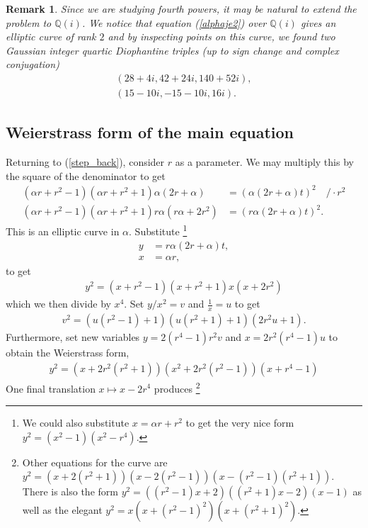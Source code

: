 \documentclass{amsart}
\newtheorem{remark}{Remark}
\begin{document}
\begin{remark} \label{kompleksna_rjesenja_4}
Since we are studying fourth powers, it may be natural to extend the problem to $\mathbb{Q}(i)$. We notice that equation (\ref{alphaje2}) over $\mathbb{Q}(i)$ gives an elliptic curve of rank $2$ and by inspecting points on this curve, we found two Gaussian integer quartic Diophantine triples (up to sign change and complex conjugation)
\begin{gather*}
     (28+4i, 42+24i, 140+52i),\\
        (15-10i, -15-10i, 16i).
\end{gather*}
\end{remark}

\subsection{Weierstrass form of the main equation}
Returning to (\ref{step_back}), consider $r$ as a parameter. We may multiply this by the square of the denominator to get
\begin{align*}
    (\alpha r + r^2-1)(\alpha r+r^2+1)\alpha (2r+\alpha) &= (\alpha(2r+\alpha)t)^2 \quad \Big/\cdot r^2\\
    (\alpha r + r^2-1)(\alpha r+r^2+1)r\alpha(r\alpha+2r^2) &=(r\alpha(2r+\alpha)t)^2.
\end{align*}
This is an elliptic curve in $\alpha$. Substitute 
\footnote{We could also substitute $x=\alpha r + r^2$ to get the very nice form $y^2=(x^2-1)(x^2-r^4)$.}
\begin{align*}
y &= r\alpha(2r+\alpha)t, \\
x &= \alpha r,
\end{align*}
to get
\begin{align}
    y^2 = (x+r^2-1)(x+r^2+1)x(x+2r^2)
\end{align}
which we then divide by $x^4$.
Set $y/x^2 = v$ and $\frac{1}{x} = u$ to get
\begin{align*}
    v^2 = (u(r^2-1)+1)(u(r^2+1)+1)(2r^2u+1). %
\end{align*}
Furthermore, set new variables $y=2(r^4-1)r^2v$ and $x = 2r^2(r^4-1) u$ to obtain the Weierstrass form,
\begin{align*}
    y^2 = (x+2r^2(r^2+1))(x^2+2r^2(r^2-1))(x+r^4-1)
\end{align*}
One final translation $x \mapsto x-2r^4$ produces
    \footnote{Other equations for the curve are $y^2 = (x+2(r^2+1))(x-2(r^2-1))(x-(r^2-1)(r^2+1))$.
    There is also the form $y^2 = ((r^2-1)x+2)((r^2+1)x-2)(x-1)$ as well as the elegant
    $y^2 =x(x+(r^2-1)^2)(x+(r^2+1)^2)$.}
\end{document}
